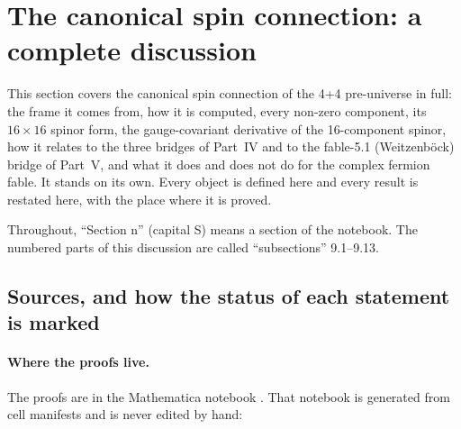 \begingroup
\setlength{\emergencystretch}{4em}
\section{The canonical spin connection: a complete discussion}
\label{csc:top}\label{sec:9}

This section covers the canonical spin connection of the 4+4 pre-universe in full: the frame it
comes from, how it is computed, every non-zero component, its $16\times16$ spinor form, the
gauge-covariant derivative of the 16-component spinor, how it relates to the three bridges of
Part~IV and to the fable-5.1 (Weitzenb\"ock) bridge of Part~V, and what it does and does not do for
the complex fermion fable. It stands on its own. Every object is defined here and every result
is restated here, with the place where it is proved.

Throughout, ``Section n'' (capital S) means a section of the notebook. The numbered parts of this
discussion are called ``subsections'' 9.1--9.13.

\subsection{Sources, and how the status of each statement is marked}
\label{csc:sources}\label{sec:9.1}

\paragraph{Where the proofs live.} The proofs are in the Mathematica notebook
. That notebook is generated from cell
manifests and is never edited by hand:

